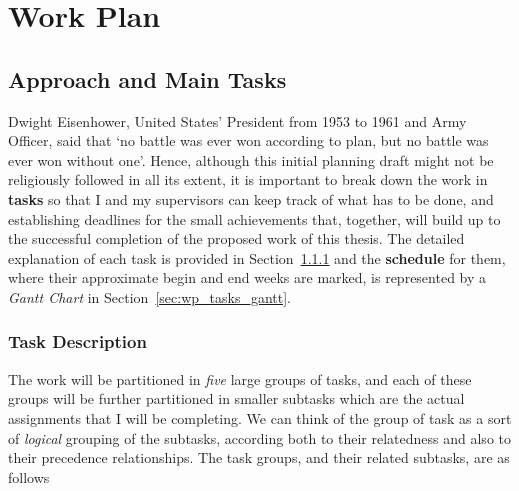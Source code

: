 \chapter{Work Plan}\label{chap:workPlan}

\section{Approach and  Main Tasks}
Dwight Eisenhower, United States' President from 1953 to 1961 and Army Officer, said that `no battle was ever won according to plan, but no battle was ever won without one'. Hence, although this initial planning draft might not be religiously followed in all its extent, it is important to break down the work in \textbf{tasks} so that I and my supervisors can keep track of what has to be done, and establishing deadlines for the small achievements that, together, will build up to the successful completion of the proposed work of this thesis. The detailed explanation of each task is provided in Section~\ref{sec:wp_tasks_td} and the \textbf{schedule} for them, where their approximate begin and end weeks are marked, is represented by a \emph{Gantt Chart} in Section~\ref{sec:wp_tasks_gantt}.

\subsection{Task Description}\label{sec:wp_tasks_td}
The work will be partitioned in \emph{five} large groups of tasks, and each of these groups will be further partitioned in smaller subtasks which are the actual assignments that I will be completing. We can think of the group of task as a sort of \emph{logical} grouping of the subtasks, according both to their relatedness and also to their precedence relationships. The task groups, and their related subtasks, are as follows

